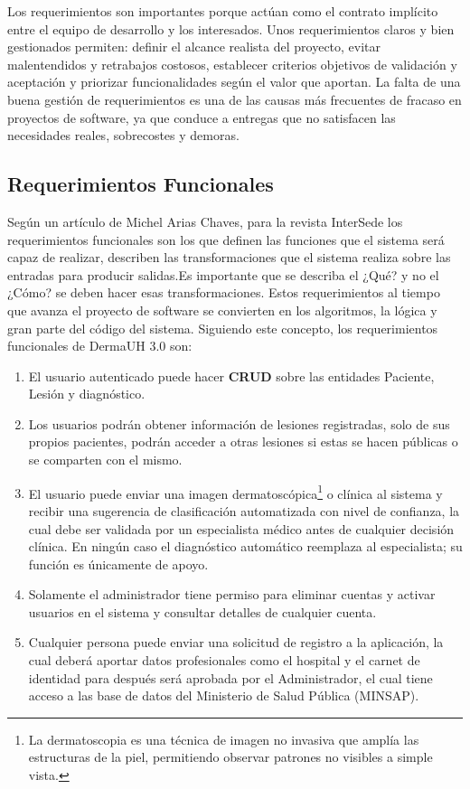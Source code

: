 Los requerimientos son importantes porque actúan como el contrato implícito entre el equipo de desarrollo y los interesados. 
Unos requerimientos claros y bien gestionados permiten: definir el alcance realista del proyecto, 
evitar malentendidos y retrabajos costosos, establecer criterios objetivos de validación y aceptación y
priorizar funcionalidades según el valor que aportan. La falta de una buena gestión de requerimientos 
es una de las causas más frecuentes de fracaso en proyectos de software, ya que conduce a entregas 
que no satisfacen las necesidades reales, sobrecostes y demoras.

\subsection{Requerimientos Funcionales}
Seg\'un un art\'iculo de Michel Arias Chaves, para la revista InterSede \cite{requerimientosFuncionales}
los requerimientos funcionales son los que definen las funciones que el sistema ser\'a capaz de realizar,
describen las transformaciones que el sistema realiza sobre las entradas para producir salidas.Es
importante que se describa el ¿Qué? y no el ¿Cómo? se deben hacer esas transformaciones. Estos
requerimientos al tiempo que avanza el proyecto de software se convierten en los algoritmos, la lógica y
gran parte del código del sistema. Siguiendo este concepto, los requerimientos funcionales de DermaUH 3.0 son:
\begin{enumerate}
    \item[RF1] El usuario autenticado puede hacer \textbf{CRUD} sobre las entidades Paciente, Lesi\'on y diagn\'ostico.
    \item[RF2] Los usuarios podr\'an obtener informaci\'on de lesiones registradas, solo de sus propios pacientes, podr\'an acceder a otras lesiones si estas se hacen p\'ublicas o se comparten con el mismo.
    \item[RF3] El usuario puede enviar una imagen dermatosc\'opica\footnote{La dermatoscopia es una técnica de imagen no invasiva que amplía las estructuras de la piel, permitiendo observar patrones no visibles a simple vista.} o cl\'inica al sistema y recibir una sugerencia de clasificaci\'on automatizada con nivel de confianza, la cual debe ser validada por un especialista m\'edico antes de cualquier decisi\'on cl\'inica. En ningún caso el diagnóstico automático reemplaza al especialista; su función es únicamente de apoyo.
    \item[RF4] Solamente el administrador tiene permiso para eliminar cuentas y activar usuarios en el sistema y consultar detalles de cualquier cuenta.
    \item[RF5] Cualquier persona puede enviar una solicitud de registro a la aplicaci\'on, la cual deber\'a aportar datos profesionales como el hospital y el carnet de identidad para despu\'es ser\'a aprobada por el Administrador, el cual tiene acceso a las base de datos del Ministerio de Salud P\'ublica (MINSAP).
\end{enumerate}

